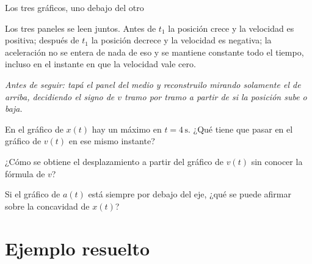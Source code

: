 \documentclass[11pt,openany]{book}
\begin{document}
\begin{bloque}{Los tres gráficos, uno debajo del otro}
\begin{center}
\end{center}

Los tres paneles se leen juntos. Antes de $t_1$ la posición crece y la velocidad es positiva; después de $t_1$ la posición decrece y la velocidad es negativa; la aceleración no se entera de nada de eso y se mantiene constante todo el tiempo, incluso en el instante en que la velocidad vale cero.

\textit{Antes de seguir: tapá el panel del medio y reconstruilo mirando solamente el de arriba, decidiendo el signo de $v$ tramo por tramo a partir de si la posición sube o baja.}
\end{bloque}

\begin{chequeo}
\item En el gráfico de $x(t)$ hay un máximo en $t=4\,\mathrm{s}$. ¿Qué tiene que pasar en el gráfico de $v(t)$ en ese mismo instante?
\item ¿Cómo se obtiene el desplazamiento a partir del gráfico de $v(t)$ sin conocer la fórmula de $v$?
\item Si el gráfico de $a(t)$ está siempre por debajo del eje, ¿qué se puede afirmar sobre la concavidad de $x(t)$?
\end{chequeo}

\section{Ejemplo resuelto}
\end{document}
